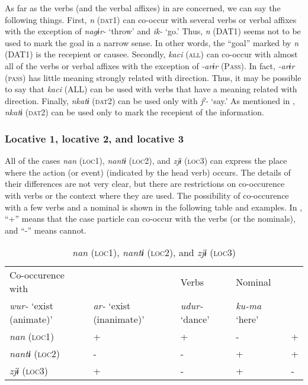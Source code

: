As far as the verbs (and the verbal affixes) in  are concerned, we can say the following things. First, \textit{n} (\textsc{dat}1) can co-occur with several verbs or verbal affixes with the exception of \textit{nagɨr-} ‘throw’ and \textit{ik-} ‘go.’ Thus, \textit{n} (DAT1) seems not to be used to mark the goal in a narrow sense. In other words, the “goal” marked by \textit{n} (DAT1) is the recepient or causee. Secondly, \textit{kaci} (\textsc{all}) can co-occur with almost all of the verbs or verbal affixes with the exception of \textit{-arɨr} (P\textsc{ass}). In fact, \textit{-arɨr} (\textsc{pass}) has little meaning strongly related with direction. Thus, it may be possible to say that \textit{kaci} (ALL) can be used with verbs that have a meaning related with direction. Finally, \textit{nkatɨ} (\textsc{dat2}) can be used only with \textit{jˀ-} ‘say.’ As mentioned in , \textit{nkatɨ} (\textsc{dat2}) can be used only to mark the recepient of the information.

\subsubsection{Locative 1, locative 2, and locative 3}

All of the cases \textit{nan} (\textsc{loc1}), \textit{nantɨ} (\textsc{loc2}), and \textit{zjɨ} (\textsc{loc3}) can express the place where the action (or event) (indicated by the head verb) occurs. The details of their differences are not very clear, but there are restrictions on co-occurence with verbs or the context where they are used. The possibility of co-occurence with a few verbs and a nominal is shown in the following table and examples. In , “+” means that the case particle can co-occur with the verbs (or the nominals), and “-” means cannot.

\begin{table}
\caption{\label{tab:key:43} \textmd{\textit{nan}}\textmd{ (\textsc{loc1}),} \textmd{\textit{nantɨ}}\textmd{ (\textsc{loc2}), and} \textmd{\textit{zjɨ}}\textmd{ (\textsc{loc3})}}

\begin{tabular}{lllll}
Co-occurence with  && Verbs &        Nominal\\
\textit{wur-} ‘exist (animate)’  &\textit{ar-} ‘exist (inanimate)’ & \textit{udur-} ‘dance’    &\textit{ku-ma} ‘here’\\
\textit{nan}  (\textsc{loc1})    &+ & + &  -  &  + \\
\textit{nantɨ}  (\textsc{loc2})  &- & - &  +  &  + \\
\textit{zjɨ}  (\textsc{loc3})    &+ & - &  +  &  - \\
\end{tabular}
\end{table}

